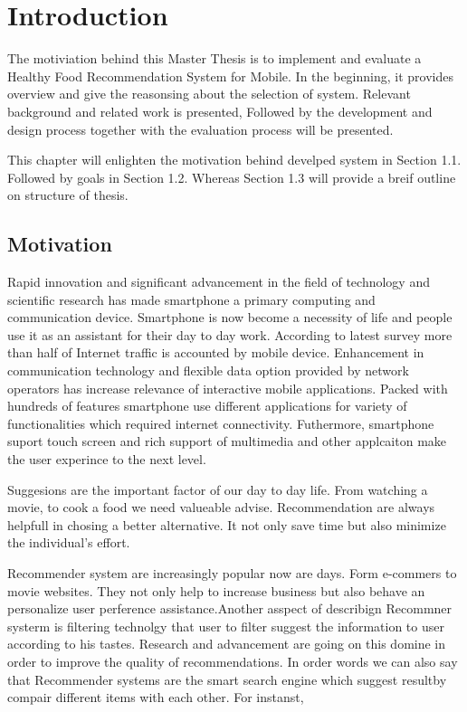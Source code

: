 \chapter{Introduction}
\setcounter{page}{1}%
\thispagestyle{empty}

The motiviation behind this Master Thesis is to implement and evaluate a Healthy Food Recommendation System for Mobile. In the beginning, it provides overview and give the reasonsing about the selection of system. Relevant background and related work is presented, Followed by the development and design process together with the evaluation process will be presented. \newline

This chapter will enlighten the motivation behind develped system in Section 1.1. Followed by goals in Section 1.2. Whereas Section 1.3 will provide a breif outline on structure of thesis.

\section{Motivation}\label{motivation}

Rapid innovation and significant advancement in the field of technology and scientific research has made smartphone a primary computing and communication device. Smartphone is now become a necessity of life and people use it as an assistant for their day to day work. According to latest survey more than half of Internet traffic is accounted by mobile device. Enhancement in communication technology and flexible data option provided by network operators has increase relevance of interactive mobile applications. Packed with hundreds of features smartphone use different applications for variety of functionalities which required internet connectivity. Futhermore, smartphone suport touch screen and rich support of multimedia and other applcaiton make the user experince to the next level.\newline

Suggesions are the important factor of our day to day life. From watching a movie, to cook a food we need valueable advise. Recommendation are always helpfull in chosing a better alternative. It not only save time but also minimize the individual's effort.\newline

Recommender system are increasingly popular now are days. Form e-commers to movie websites. They not only help to increase business but also behave an personalize user perference assistance.Another asspect of describign Recommner systerm is filtering technolgy that user to filter suggest the information to user according to his tastes. Research and advancement are going on this domine in order to improve the quality of recommendations. In order words we can also say that Recommender systems are the smart search engine which suggest resultby compair different items with each other. For instanst, 


